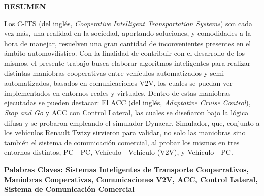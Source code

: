 		\begin{center}
    \textbf{RESUMEN}\\
    \end{center}

\noindent
%
Los C-ITS (del inglés, \textit{Cooperative Intelligent Transportation Systems}) son cada vez más, una realidad en la sociedad, aportando soluciones, y comodidades a la hora de manejar, resuelven una gran cantidad de inconvenientes presentes en el ámbito automovilístico. Con la finalidad de contribuir con el desarrollo de los mismos, el presente trabajo busca elaborar algoritmos inteligentes para realizar distintas maniobras cooperativas entre vehículos automatizados y semi-automatizados, basados en comunicaciones V2V, los cuales se puedan ver implementados en entornos reales y virtuales. Dentro de estas maniobras ejecutadas se pueden destacar: El ACC (del inglés, \textit{Adaptative Cruise Control}), \textit{Stop and Go} y ACC con Control Lateral, las cuales se diseñaron bajo la lógica difusa y se probaron empleando el simulador Dynacar. Simulador, que, conjunto a los vehículos Renault Twizy sirvieron para validar, no solo las maniobras sino también el sistema de comunicación comercial, al probar los mismos en tres entornos distintos, PC - PC, Vehículo - Vehículo (V2V), y Vehículo - PC.

\vspace{0.5cm}
\noindent
\textbf{Palabras Claves: Sistemas Inteligentes de Transporte Cooperrativos, Maniobras Cooperativas, Comunicaciones V2V, ACC, Control Lateral, Sistema de Comunicación Comercial}
    \\
\pagebreak
